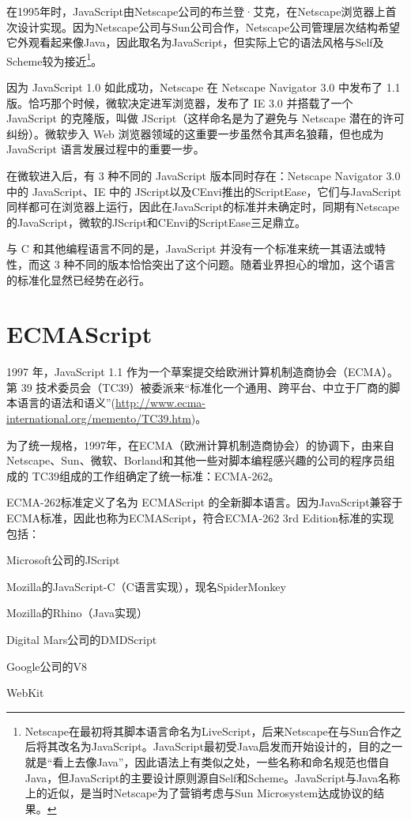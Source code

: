 在1995年时，JavaScript由Netscape公司的布兰登·艾克，在Netscape浏览器上首次设计实现。因为Netscape公司与Sun公司合作，Netscape公司管理层次结构希望它外观看起来像Java，因此取名为JavaScript，但实际上它的语法风格与Self及Scheme较为接近\footnote{Netscape在最初将其脚本语言命名为LiveScript，后来Netscape在与Sun合作之后将其改名为JavaScript。JavaScript最初受Java启发而开始设计的，目的之一就是“看上去像Java”，因此语法上有类似之处，一些名称和命名规范也借自Java，但JavaScript的主要设计原则源自Self和Scheme。JavaScript与Java名称上的近似，是当时Netscape为了营销考虑与Sun Microsystem达成协议的结果。}。

因为 JavaScript 1.0 如此成功，Netscape 在 Netscape Navigator 3.0 中发布了 1.1 版。恰巧那个时候，微软决定进军浏览器，发布了 IE 3.0 并搭载了一个 JavaScript 的克隆版，叫做 JScript（这样命名是为了避免与 Netscape 潜在的许可纠纷）。微软步入 Web 浏览器领域的这重要一步虽然令其声名狼藉，但也成为 JavaScript 语言发展过程中的重要一步。

在微软进入后，有 3 种不同的 JavaScript 版本同时存在：Netscape Navigator 3.0 中的 JavaScript、IE 中的 JScript以及CEnvi推出的ScriptEase，它们与JavaScript同样都可在浏览器上运行，因此在JavaScript的标准并未确定时，同期有Netscape的JavaScript，微软的JScript和CEnvi的ScriptEase三足鼎立。

与 C 和其他编程语言不同的是，JavaScript 并没有一个标准来统一其语法或特性，而这 3 种不同的版本恰恰突出了这个问题。随着业界担心的增加，这个语言的标准化显然已经势在必行。

\chapter{ECMAScript}

1997 年，JavaScript 1.1 作为一个草案提交给欧洲计算机制造商协会（ECMA）。第 39 技术委员会（TC39）被委派来“标准化一个通用、跨平台、中立于厂商的脚本语言的语法和语义”(\url{http://www.ecma-international.org/memento/TC39.htm})。

为了统一规格，1997年，在ECMA（欧洲计算机制造商协会）的协调下，由来自Netscape、Sun、微软、Borland和其他一些对脚本编程感兴趣的公司的程序员组成的 TC39组成的工作组确定了统一标准：ECMA-262。

ECMA-262标准定义了名为 ECMAScript 的全新脚本语言。因为JavaScript兼容于ECMA标准，因此也称为ECMAScript，符合ECMA-262 3rd Edition标准的实现包括：

\begin{compactitem}
\item Microsoft公司的JScript
\item Mozilla的JavaScript-C（C语言实现），现名SpiderMonkey
\item Mozilla的Rhino（Java实现）
\item Digital Mars公司的DMDScript
\item Google公司的V8
\item WebKit
\end{compactitem}


